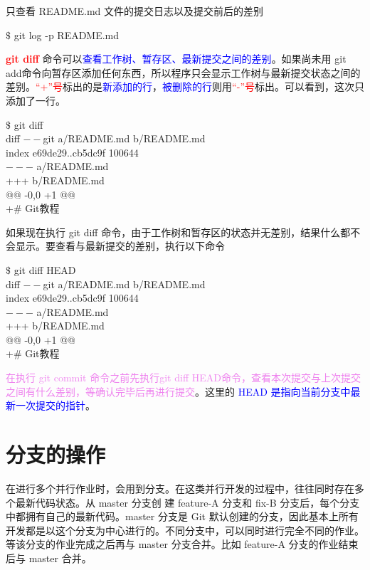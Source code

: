 \documentclass[12pt,a4paper]{article}
\begin{document}
只查看 README.md 文件的提交日志以及提交前后的差别
\begin{tcolorbox}[colback=green!5,colframe=green!40!black,title= ]
$\$$ git log -p README.md
\end{tcolorbox}
\textcolor{red}{\bf git diff} 命令可以\textcolor{blue}{查看工作树、暂存区、最新提交之间的差别}。如果尚未用 git add命令向暂存区添加任何东西，所以程序只会显示工作树与最新提交状态之间的差别。\textcolor{red}{``+”号}标出的是\textcolor{blue}{新添加的行}，\textcolor{blue}{被删除的行}则用\textcolor{red}{``-”号}标出。可以看到，这次只添加了一行。
\begin{tcolorbox}[colback=green!5,colframe=green!40!black,title= ]
$\$$ git diff \\
diff $--$git a/README.md b/README.md \\
index e69de29..cb5dc9f 100644 \\
$---$ a/README.md \\
+++ b/README.md \\
@@ -0,0 +1 @@ \\
+$\#$ Git教程
\end{tcolorbox}
如果现在执行 git diff 命令，由于工作树和暂存区的状态并无差别，结果什么都不会显示。要查看与最新提交的差别，执行以下命令
\begin{tcolorbox}[colback=green!5,colframe=green!40!black,title= ]
$\$$ git diff HEAD \\
diff $--$git a/README.md b/README.md \\
index e69de29..cb5dc9f 100644 \\
$---$ a/README.md \\
+++ b/README.md \\
@@ -0,0 +1 @@ \\
+$\#$ Git教程
\end{tcolorbox}
\textcolor{violet}{在执行 git commit 命令之前先执行git diff HEAD命令，查看本次提交与上次提交之间有什么差别，等确认完毕后再进行提交}。这里的 \textcolor{blue}{HEAD 是指向当前分支中最新一次提交的指针}。


\section{分支的操作}
在进行多个并行作业时，会用到分支。在这类并行开发的过程中，往往同时存在多个最新代码状态。从 master 分支创
建 feature-A 分支和 fix-B 分支后，每个分支中都拥有自己的最新代码。master 分支是 Git 默认创建的分支，因此基本上所有开发都是以这个分支为中心进行的。不同分支中，可以同时进行完全不同的作业。等该分支的作业完成之后再与 master 分支合并。比如 feature-A 分支的作业结束后与 master 合并。
\end{document}
